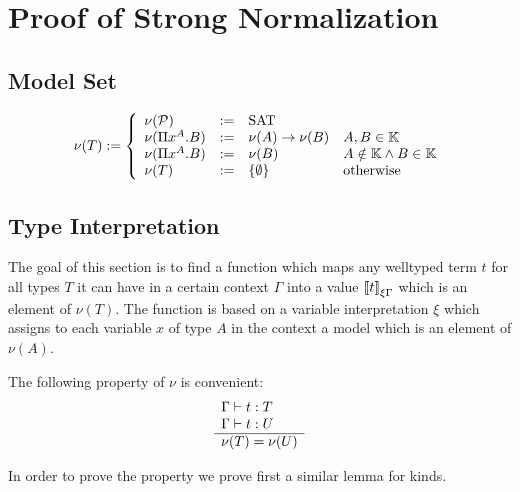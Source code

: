 \section{Proof of Strong Normalization}


\subsection{Model Set}

\begin{definition}
$$
    \nu(T) :=
    \left \{
    \begin{array}{llll}
        \nu({\cal P}) &:=& \text{SAT}
        \\
        \nu(\Pi x^A. B) &:=& \nu(A)\to \nu(B) & A,B \in \mathbb{K}
        \\
        \nu(\Pi x^A. B) &:=& \nu(B) & A \notin \mathbb{K} \land B \in \mathbb{K}
        \\
        \nu (T) &:=& {\{\emptyset\}} &\text{otherwise}
    \end{array}
    \right.
$$
\end{definition}


\subsection{Type Interpretation}

The goal of this section is to find a function which maps any welltyped term $t$
for all types $T$ it can have in a certain context $\Gamma$ into a value
${{[\![} t{]\!]}}_{\xi\Gamma}$ which is an element of $\nu (T)$. The function is
based on a variable interpretation $\xi$ which assigns to each variable $x$ of
type $A$ in the context a model which is an element of $\nu(A)$.

The following property of $\nu$ is convenient:
$$
    \begin{array}{l} 
        \Gamma \vdash t: T
        \\
        \Gamma \vdash t: U
     \\ \hline 
        \nu(T) = \nu(U)
    \end{array}
$$


In order to prove the property we prove first a similar lemma for kinds.

